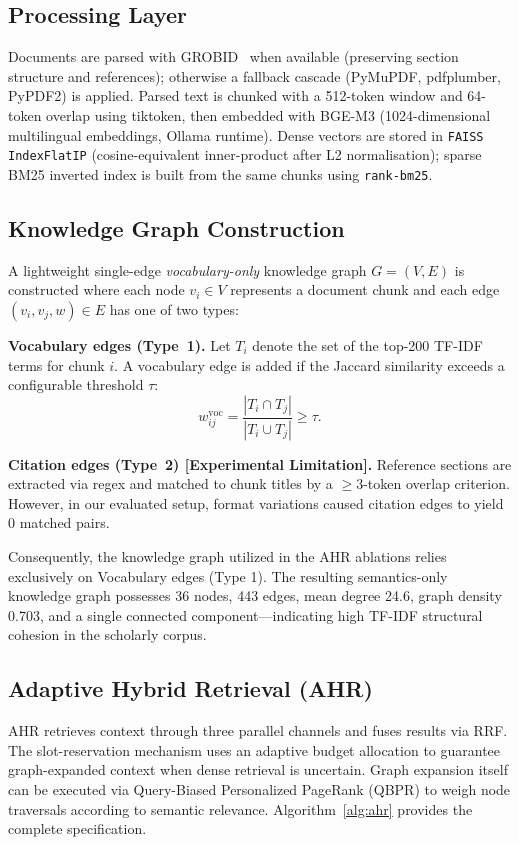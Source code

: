 \documentclass[journal]{IEEEtran}
\begin{document}
\subsection{Processing Layer}
Documents are parsed with GROBID~\cite{lopez2009grobid} when available
(preserving section structure and references); otherwise a
fallback cascade (PyMuPDF, pdfplumber, PyPDF2) is applied.
Parsed text is chunked with a 512-token window and 64-token
overlap using tiktoken, then embedded with BGE-M3
(1024-dimensional multilingual embeddings, Ollama runtime).
Dense vectors are stored in \texttt{FAISS IndexFlatIP} (cosine-equivalent
inner-product after L2 normalisation); sparse BM25 inverted index
is built from the same chunks using \texttt{rank-bm25}.

\subsection{Knowledge Graph Construction}
A lightweight single-edge \emph{vocabulary-only} knowledge graph $G=(V,E)$ is constructed
where each node $v_i \in V$ represents a document chunk and each
edge $(v_i, v_j, w) \in E$ has one of two types:

\textbf{Vocabulary edges (Type~1).}
Let $T_i$ denote the set of the top-200 TF-IDF terms for chunk $i$.
A vocabulary edge is added if the Jaccard similarity exceeds a
configurable threshold $\tau$:
\begin{equation}
  w^{\mathrm{voc}}_{ij} = \frac{|T_i \cap T_j|}{|T_i \cup T_j|} \geq \tau.
  \label{eq:jaccard}
\end{equation}

\textbf{Citation edges (Type~2) [Experimental Limitation].}
Reference sections are extracted via regex and matched to chunk titles by a $\geq 3$-token overlap criterion. However, in our evaluated setup, format variations caused citation edges to yield 0 matched pairs. 

Consequently, the knowledge graph utilized in the AHR ablations relies exclusively on Vocabulary edges (Type 1). The resulting semantics-only knowledge graph possesses 36 nodes, 443 edges, mean degree 24.6, graph density 0.703, and a single connected component—indicating high TF-IDF structural cohesion in the scholarly corpus.

\subsection{Adaptive Hybrid Retrieval (AHR)}
AHR retrieves context through three parallel channels and fuses
results via RRF. The slot-reservation mechanism uses an adaptive budget
allocation to guarantee graph-expanded context when dense retrieval is uncertain.
Graph expansion itself can be executed via Query-Biased Personalized PageRank (QBPR)
to weigh node traversals according to semantic relevance.
Algorithm~\ref{alg:ahr} provides the complete specification.
\end{document}
